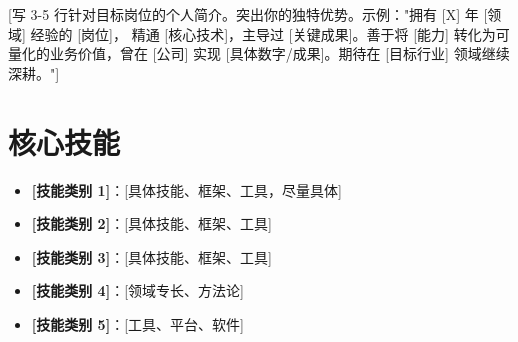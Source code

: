 \documentclass[11pt,a4paper,sans]{moderncv}
\begin{document}
\makecvtitle


\vspace{6pt}
\small{[写 3-5 行针对目标岗位的个人简介。突出你的独特优势。示例："拥有 [X] 年 [领域] 经验的 [岗位]，
精通 [核心技术]，主导过 [关键成果]。善于将 [能力] 转化为可量化的业务价值，曾在 [公司] 实现
[具体数字/成果]。期待在 [目标行业] 领域继续深耕。"]}


\section{核心技能}
\vspace{1pt}
\begin{itemize}

\item \textbf{[技能类别 1]}：[具体技能、框架、工具，尽量具体]

\item \textbf{[技能类别 2]}：[具体技能、框架、工具]

\item \textbf{[技能类别 3]}：[具体技能、框架、工具]

\item \textbf{[技能类别 4]}：[领域专长、方法论]

\item \textbf{[技能类别 5]}：[工具、平台、软件]

\end{itemize}

\end{document}
